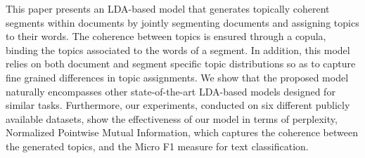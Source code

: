 This paper presents an LDA-based model that generates topically coherent segments within documents by jointly segmenting documents and assigning topics to their words. The coherence between topics is ensured through a copula, binding the topics associated to the words of a segment. In addition, this model relies on both document and segment specific topic distributions so as to capture fine grained differences in topic assignments. We show that the proposed model naturally encompasses other state-of-the-art LDA-based models designed for similar tasks. Furthermore, our experiments, conducted on six different publicly available datasets, show the effectiveness of our model in terms of perplexity, Normalized Pointwise Mutual Information, which captures the coherence between the generated topics, and the Micro F1 measure for text classification.

